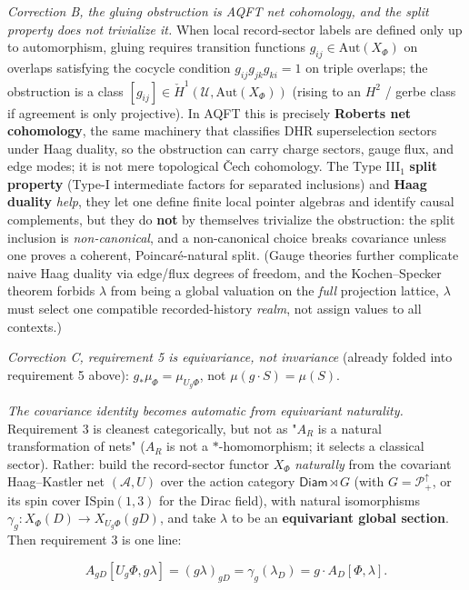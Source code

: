 \documentclass[11pt,a4paper]{article}
\begin{document}
\emph{Correction B, the gluing obstruction is AQFT net cohomology, and the split property does not trivialize it.} When local record-sector labels are defined only up to automorphism, gluing requires transition functions $g_{ij} \in \mathrm{Aut}(X_\Phi)$ on overlaps satisfying the cocycle condition $g_{ij}g_{jk}g_{ki} = 1$ on triple overlaps; the obstruction is a class $[g_{ij}] \in \check{H}^1(\mathcal U, \mathrm{Aut}(X_\Phi))$ (rising to an $H^2$ / gerbe class if agreement is only projective). In AQFT this is precisely \textbf{Roberts net cohomology}, the same machinery that classifies DHR superselection sectors under Haag duality, so the obstruction can carry charge sectors, gauge flux, and edge modes; it is not mere topological Čech cohomology. The Type III$_1$ \textbf{split property} (Type-I intermediate factors for separated inclusions) and \textbf{Haag duality} \emph{help}, they let one define finite local pointer algebras and identify causal complements, but they do \textbf{not} by themselves trivialize the obstruction: the split inclusion is \emph{non-canonical}, and a non-canonical choice breaks covariance unless one proves a coherent, Poincaré-natural split. (Gauge theories further complicate naive Haag duality via edge/flux degrees of freedom, and the Kochen–Specker theorem forbids $\lambda$ from being a global valuation on the \emph{full} projection lattice, $\lambda$ must select one compatible recorded-history \emph{realm}, not assign values to all contexts.)

\emph{Correction C, requirement 5 is equivariance, not invariance} (already folded into requirement 5 above): $g_*\mu_\Phi = \mu_{U_g\Phi}$, not $\mu(g\cdot S) = \mu(S)$.

\emph{The covariance identity becomes automatic from equivariant naturality.} Requirement 3 is cleanest categorically, but not as "$A_R$ is a natural transformation of nets" ($A_R$ is not a $*$-homomorphism; it selects a classical sector). Rather: build the record-sector functor $X_\Phi$ \emph{naturally} from the covariant Haag–Kastler net $(\mathcal A, U)$ over the action category $\mathsf{Diam} \rtimes G$ (with $G = \mathcal{P}^\uparrow_+$, or its spin cover $\mathrm{ISpin}(1,3)$ for the Dirac field), with natural isomorphisms $\gamma_g : X_\Phi(D) \to X_{U_g\Phi}(gD)$, and take $\lambda$ to be an \textbf{equivariant global section}. Then requirement 3 is one line:

\[
A_{gD}[U_g\Phi, g\lambda] = (g\lambda)_{gD} = \gamma_g(\lambda_D) = g \cdot A_D[\Phi,\lambda].
\]
\end{document}
